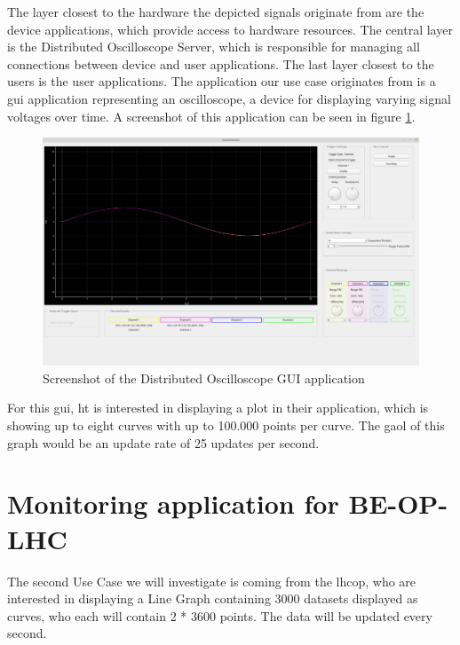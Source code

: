 The layer closest to the hardware the depicted signals originate from are the
device applications, which provide access to hardware resources. The central
layer is the Distributed Oscilloscope Server, which is responsible for managing all
connections between device and user applications. The last layer closest to the
users is the user applications. The application our use case originates from
is a \gls{gui} application representing an oscilloscope, a device for displaying
varying signal voltages over time. A screenshot of this application can be seen
in figure \ref{fig:dogui}.
\cite{DistrOscDocs, BeCoHtSection}

\begin{figure}[h]
    \centering
    \includegraphics[width=15cm]{resources/img/DistributedOscilloscope}
    \caption{
        Screenshot of the Distributed Oscilloscope GUI application
    }
    \label{fig:dogui}
\end{figure}

For this \gls{gui}, \gls{ht} is interested in displaying a plot in their
application, which is showing up to eight curves with up to 100.000 points per
curve. The gaol of this graph would be an update rate of 25 updates per second.


\section{Monitoring application for BE-OP-LHC}
\label{sec:usecases:becolhc}

The second Use Case we will investigate is coming from the \gls{lhcop}, who are
interested in displaying a Line Graph containing 3000 datasets displayed as
curves, who each will contain 2 * 3600 points. The data will be updated every
second.


